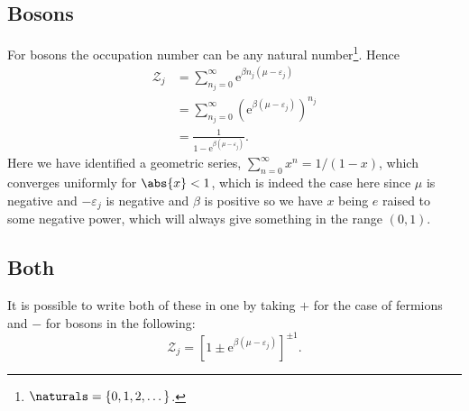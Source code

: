 \documentclass[fleqn]{NotesClass}
\newcommand*{\e}{\mathrm{e}}
\begin{document}
    \subsection{Bosons}
    For bosons the occupation number can be any natural number\footnote{\(\naturals = \{0, 1, 2, \dotsc\}\).}.
    Hence
    \begin{align}
        \mathcal{Z}_j &= \sum_{n_j = 0}^{\infty} \e^{\beta n_j(\mu - \varepsilon_j)}\\
        &= \sum_{n_j = 0}^{\infty} \left( \e^{\beta(\mu - \varepsilon_j)} \right)^{n_j}\\
        &= \frac{1}{1 - \e^{\beta(\mu - \varepsilon_j)}}.
    \end{align}
    Here we have identified a geometric series, \(\sum_{n = 0}^{\infty} x^n = 1/(1 - x)\), which converges uniformly for \(\abs{x} < 1\), which is indeed the case here since \(\mu\) is negative and \(-\varepsilon_j\) is negative and \(\beta\) is positive so we have \(x\) being \(e\) raised to some negative power, which will always give something in the range \((0, 1)\).
    
    \subsection{Both}
    It is possible to write both of these in one by taking \(+\) for the case of fermions and \(-\) for bosons in the following:
    \begin{equation}\label{eqn:single particle grand canonical partition function}
        \mathcal{Z}_j = [1 \pm \e^{\beta(\mu - \varepsilon_j)}]^{\pm 1}.
    \end{equation}
    
\end{document}
